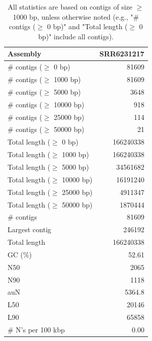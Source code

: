 \documentclass[12pt,a4paper]{article}
\begin{document}
\begin{table}[ht]
\begin{center}
\caption{All statistics are based on contigs of size $\geq$ 1000 bp, unless otherwise noted (e.g., "\# contigs ($\geq$ 0 bp)" and "Total length ($\geq$ 0 bp)" include all contigs).}
\begin{tabular}{|l*{1}{|r}|}
\hline
Assembly & SRR6231217 \\ \hline
\# contigs ($\geq$ 0 bp) & 81609 \\ \hline
\# contigs ($\geq$ 1000 bp) & 81609 \\ \hline
\# contigs ($\geq$ 5000 bp) & 3648 \\ \hline
\# contigs ($\geq$ 10000 bp) & 918 \\ \hline
\# contigs ($\geq$ 25000 bp) & 114 \\ \hline
\# contigs ($\geq$ 50000 bp) & 21 \\ \hline
Total length ($\geq$ 0 bp) & 166240338 \\ \hline
Total length ($\geq$ 1000 bp) & 166240338 \\ \hline
Total length ($\geq$ 5000 bp) & 34561682 \\ \hline
Total length ($\geq$ 10000 bp) & 16191240 \\ \hline
Total length ($\geq$ 25000 bp) & 4911347 \\ \hline
Total length ($\geq$ 50000 bp) & 1870444 \\ \hline
\# contigs & 81609 \\ \hline
Largest contig & 246192 \\ \hline
Total length & 166240338 \\ \hline
GC (\%) & 52.61 \\ \hline
N50 & 2065 \\ \hline
N90 & 1118 \\ \hline
auN & 5364.8 \\ \hline
L50 & 20146 \\ \hline
L90 & 65858 \\ \hline
\# N's per 100 kbp & 0.00 \\ \hline
\end{tabular}
\end{center}
\end{table}
\end{document}
